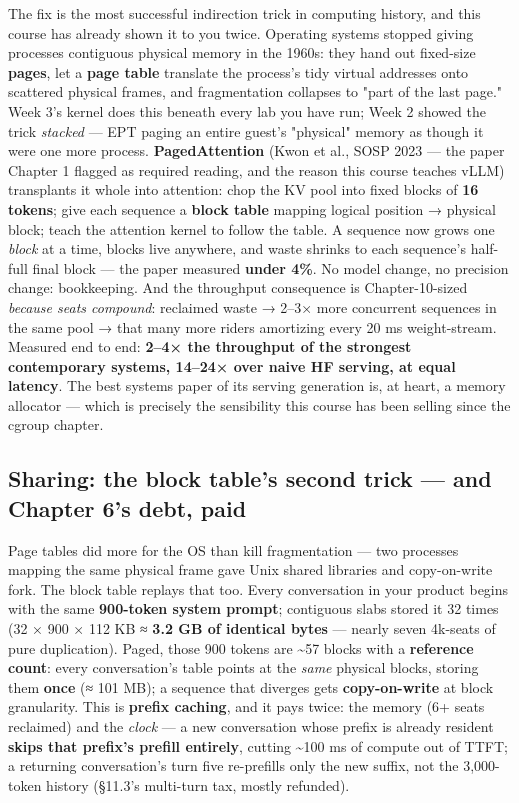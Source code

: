 The fix is the most successful indirection trick in computing history, and this course has already shown it to you twice. Operating systems stopped giving processes contiguous physical memory in the 1960s: they hand out fixed-size \textbf{pages}, let a \textbf{page table} translate the process's tidy virtual addresses onto scattered physical frames, and fragmentation collapses to "part of the last page." Week 3's kernel does this beneath every lab you have run; Week 2 showed the trick \textit{stacked} — EPT paging an entire guest's "physical" memory as though it were one more process. \textbf{PagedAttention} (Kwon et al., SOSP 2023 — the paper Chapter 1 flagged as required reading, and the reason this course teaches vLLM) transplants it whole into attention: chop the KV pool into fixed blocks of \textbf{16 tokens}; give each sequence a \textbf{block table} mapping logical position → physical block; teach the attention kernel to follow the table. A sequence now grows one \textit{block} at a time, blocks live anywhere, and waste shrinks to each sequence's half-full final block — the paper measured \textbf{under 4\%}. No model change, no precision change: bookkeeping. And the throughput consequence is Chapter-10-sized \textit{because seats compound}: reclaimed waste → 2–3× more concurrent sequences in the same pool → that many more riders amortizing every 20 ms weight-stream. Measured end to end: \textbf{2–4× the throughput of the strongest contemporary systems, 14–24× over naive HF serving, at equal latency}. The best systems paper of its serving generation is, at heart, a memory allocator — which is precisely the sensibility this course has been selling since the cgroup chapter.

\subsection*{Sharing: the block table's second trick — and Chapter 6's debt, paid}

Page tables did more for the OS than kill fragmentation — two processes mapping the same physical frame gave Unix shared libraries and copy-on-write fork. The block table replays that too. Every conversation in your product begins with the same \textbf{900-token system prompt}; contiguous slabs stored it 32 times (32 × 900 × 112 KB ≈ \textbf{3.2 GB of identical bytes} — nearly seven 4k-seats of pure duplication). Paged, those 900 tokens are \textasciitilde{}57 blocks with a \textbf{reference count}: every conversation's table points at the \textit{same} physical blocks, storing them \textbf{once} (≈ 101 MB); a sequence that diverges gets \textbf{copy-on-write} at block granularity. This is \textbf{prefix caching}, and it pays twice: the memory (6+ seats reclaimed) and the \textit{clock} — a new conversation whose prefix is already resident \textbf{skips that prefix's prefill entirely}, cutting \textasciitilde{}100 ms of compute out of TTFT; a returning conversation's turn five re-prefills only the new suffix, not the 3,000-token history (§11.3's multi-turn tax, mostly refunded).

